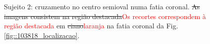 \begin{figure}[H]
\centering
    \hfill
    \caption{Sujeito 2: cruzamento no centro semioval numa fatia coronal. \sout{As imagens consistem na região destacada}\textcolor{red}{Os recortes correspondem à região destacada} em \sout{ciano}\textcolor{red}{laranja} na fatia coronal da Fig. \ref{fig::103818_localizacao}.
    }
    \label{fig::103818_fanning}
\end{figure}


